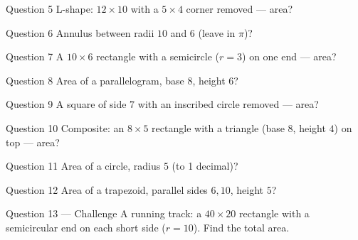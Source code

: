 \documentclass[11pt]{article}
\begin{document}
\begin{qbox}{Question 5}
L-shape: $12\times10$ with a $5\times4$ corner removed — area?\workspace{2.4cm}
\end{qbox}

\begin{qbox}{Question 6}
Annulus between radii $10$ and $6$ (leave in $\pi$)?\workspace{2.4cm}
\end{qbox}

\begin{qbox}{Question 7}
A $10\times6$ rectangle with a semicircle ($r=3$) on one end — area?\workspace{2.4cm}
\end{qbox}

\begin{qbox}{Question 8}
Area of a parallelogram, base $8$, height $6$?\workspace{2.4cm}
\end{qbox}

\begin{qbox}{Question 9}
A square of side $7$ with an inscribed circle removed — area?\workspace{2.4cm}
\end{qbox}

\begin{qbox}{Question 10}
Composite: an $8\times5$ rectangle with a triangle (base $8$, height $4$) on top — area?\workspace{2.4cm}
\end{qbox}

\begin{qbox}{Question 11}
Area of a circle, radius $5$ (to 1 decimal)?\workspace{2.4cm}
\end{qbox}

\begin{qbox}{Question 12}
Area of a trapezoid, parallel sides $6,10$, height $5$?\workspace{2.4cm}
\end{qbox}

\begin{qbox}{Question 13 --- Challenge}
A running track: a $40\times20$ rectangle with a semicircular end on each short side ($r=10$). Find the total area.\workspace{3cm}
\end{qbox}

\clearpage
{}
\end{document}
